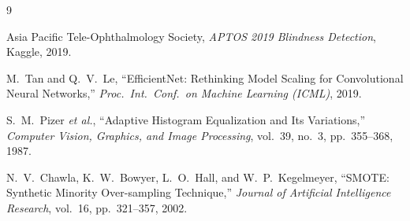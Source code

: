 \documentclass[11pt,a4paper]{article}
\begin{document}
\begin{thebibliography}{9}

Asia Pacific Tele-Ophthalmology Society,
\emph{APTOS 2019 Blindness Detection},
Kaggle, 2019.

M.~Tan and Q.~V.~Le,
``EfficientNet: Rethinking Model Scaling for Convolutional Neural Networks,''
\emph{Proc.\ Int.\ Conf.\ on Machine Learning (ICML)}, 2019.

S.~M.~Pizer \emph{et al.},
``Adaptive Histogram Equalization and Its Variations,''
\emph{Computer Vision, Graphics, and Image Processing}, vol.~39, no.~3,
pp.~355--368, 1987.

N.~V.~Chawla, K.~W.~Bowyer, L.~O.~Hall, and W.~P.~Kegelmeyer,
``SMOTE: Synthetic Minority Over-sampling Technique,''
\emph{Journal of Artificial Intelligence Research}, vol.~16, pp.~321--357,
2002.

\end{thebibliography}
\end{document}
